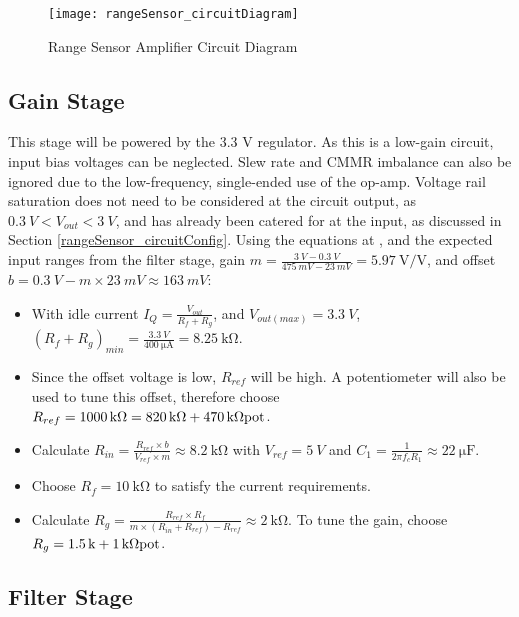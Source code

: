 \begin{figure}[!htb]
  \centering
  \texttt{[image: rangeSensor\_circuitDiagram]}
  \caption{Range Sensor Amplifier Circuit Diagram}
  \label{fig:rangeSensor_circuitDiagram}
\end{figure}

\subsection{Gain Stage}

This stage will be powered by the 3.3 V regulator. As this is a low-gain circuit, input bias voltages can be neglected.
Slew rate and CMMR imbalance can also be ignored due to the low-frequency, single-ended use of the op-amp.
Voltage rail saturation does not need to be considered at the circuit output, as $\SI{0.3}{V} < V_{out} < \SI{3}{V}$,
and has already been catered for at the input, as discussed in Section \ref{rangeSensor_circuitConfig}.
Using the equations at \cite{gainOffset30Seconds}, and the expected input ranges from the filter stage,
gain $m = \frac{\SI{3}{V} - \SI{0.3}{V}}{\SI{475}{mV} - \SI{23}{mV}} = \SI{5.97}{\volt\per\volt}$,
and offset $b = \SI{0.3}{V} - m \times \SI{23}{mV} \approx \SI{163}{mV}$:

\begin{itemize}
  \item With idle current $I_Q = \frac{V_{out}}{R_f + R_g}$, and $V_{out(max)} = \SI{3.3}{V}$, $(R_f + R_g)_{min} = \frac{\SI{3.3}{V}}{\SI{400}{\micro\ampere}} = \SI{8.25}{\kilo\ohm}$.
  \item Since the offset voltage is low, $R_{ref}$ will be high. A potentiometer will also be used to tune this offset, therefore choose $R_{ref} = \SI{1000}{\kilo\ohm} = \SI{820}{\kilo\ohm} + \SI{470}{\kilo\ohm} \textnormal{pot}$.
  \item Calculate $R_{in} = \frac{R_{ref} \times b}{V_{ref} \times m} \approx \SI{8.2}{\kilo\ohm}$ with $V_{ref} = \SI{5}{V}$ and $C_1 = \frac{1}{2 \pi f_c R_1} \approx \SI{22}{\micro\farad}$.
  \item Choose $R_f = \SI{10}{\kilo\ohm}$ to satisfy the current requirements.
  \item Calculate $R_g = \frac{R_{ref} \times R_f}{m \times (R_{in} + R_{ref}) - R_{ref}} \approx \SI{2}{\kilo\ohm}$. To tune the gain, choose $R_g = \SI{1.5}{k} + \SI{1}{\kilo\ohm}\textnormal{pot}$.
\end{itemize}


\subsection{Filter Stage}


